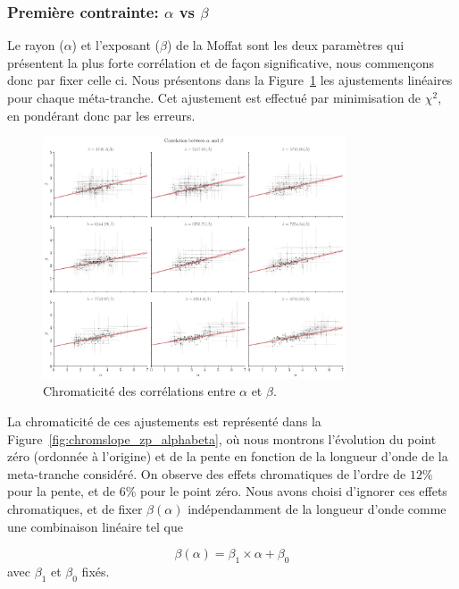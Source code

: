 \documentclass[../main/main.tex]{subfiles}
\begin{document}
\subsubsection{Première contrainte: $\alpha$ vs $\beta$}

Le rayon ($\alpha$) et l'exposant ($\beta$) de la Moffat sont les deux
paramètres qui présentent la plus forte corrélation et de façon significative, nous commençons
donc par fixer celle ci. Nous présentons dans la
Figure~\ref{fig:alphabetachromcorr} les ajustements linéaires pour
chaque méta-tranche. Cet ajustement est effectué par minimisation de
$\chi^{2}$, en pondérant donc par les erreurs.


\begin{figure}[ht]
  \centering
  \includegraphics[width=0.8\textwidth]{../figures/06_irf/STD_alpha_beta_chromatic_corr.pdf}
  \caption[Chromaticité des corrélations entre $\alpha$ et $\beta$]{Chromaticité des corrélations entre $\alpha$ et $\beta$.}
  \label{fig:alphabetachromcorr}
\end{figure}

La chromaticité de ces ajustements est représenté dans la
Figure~\ref{fig:chromslope_zp_alphabeta}, où nous montrons l'évolution
du point zéro (ordonnée à l'origine) et de la pente en fonction de la
longueur d'onde de la meta-tranche considéré. On observe des effets
chromatiques de l'ordre de $12\%$ pour la pente, et de $6\%$ pour le
point zéro.
Nous avons choisi d'ignorer ces effets chromatiques, et de fixer
$\beta(\alpha)$ indépendamment de la longueur d'onde comme une
combinaison linéaire tel que

\begin{equation}
  \label{eq:betaalpha}
  \beta(\alpha) = \beta_{1}\times \alpha + \beta_{0}
\end{equation}
avec $\beta_{1}$ et $\beta_{0}$ fixés.
\end{document}
